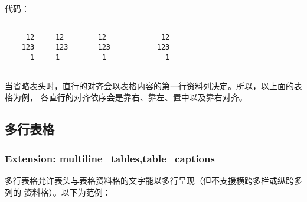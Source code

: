\documentclass[fancyhdr,bookmark]{ctexbook}
\begin{document}
代码：

\begin{lstlisting}
-------     ------ ----------   -------
     12     12        12             12
    123     123       123           123
      1     1          1              1
-------     ------ ----------   -------
\end{lstlisting}

当省略表头时，直行的对齐会以表格内容的第一行资料列决定。所以，以上面的表格为例，
各直行的对齐依序会是靠右、靠左、置中以及靠右对齐。

\subsection{多行表格}\label{ux591aux884cux8868ux683c}

\subsubsection{Extension:
multiline\_tables,table\_captions}\label{extension-multiline_tablestable_captions}

多行表格允许表头与表格资料格的文字能以多行呈现（但不支援横跨多栏或纵跨多列的
资料格）。以下为范例：
\end{document}
